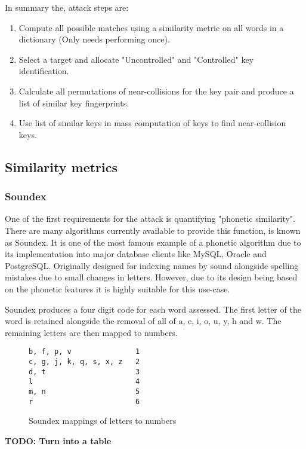 In summary the, attack steps are:

\begin{enumerate}
    \item Compute all possible matches using a similarity metric on all words in a dictionary (Only needs performing once).

    \item Select a target and allocate "Uncontrolled" and "Controlled" key identification.
    
    \item Calculate all permutations of near-collisions for the key pair and produce a list of similar key fingerprints.
    
    \item Use list of similar keys in mass computation of keys to find near-collision keys.

\end{enumerate}

\subsection{Similarity metrics}

\subsubsection{Soundex}
One of the first requirements for the attack is quantifying "phonetic similarity". There are many algorithms currently available to provide this function, is known as Soundex. It is one of the most famous example of a phonetic algorithm due to its implementation into major database clients like MySQL\cite{mysql_soundex}, Oracle\cite{moved_2005} and PostgreSQL\cite{postgresql}. Originally designed for indexing names by sound alongside spelling mistakes due to small changes in letters. However, due to its design being based on the phonetic features it is highly suitable for this use-case. 

Soundex produces a four digit code for each word assessed.
The first letter of the word is retained alongside the removal of all of a, e, i, o, u, y, h and w. The remaining letters are then mapped to numbers.

\begin{figure}[h!]
    \centering
    \begin{BVerbatim}
b, f, p, v               1
c, g, j, k, q, s, x, z   2
d, t                     3
l                        4
m, n                     5
r                        6
    \end{BVerbatim}

    \caption{Soundex mappings of letters to numbers}
\end{figure}
\textbf{TODO: Turn into a table}


